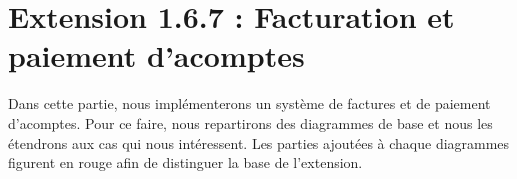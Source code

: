 \section{Extension 1.6.7 : Facturation et paiement d'acomptes}
\begin{flushleft}
Dans cette partie, nous implémenterons un système de factures et de paiement d'acomptes. Pour ce faire, nous repartirons des diagrammes de base et nous les étendrons aux cas qui nous intéressent. Les parties ajoutées à chaque diagrammes figurent en rouge afin de distinguer la base de l'extension.
\end{flushleft}
